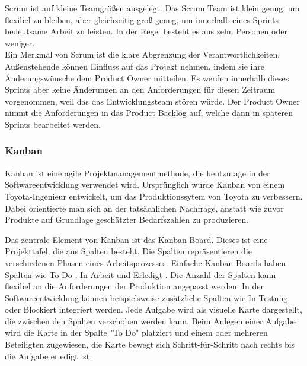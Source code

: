 \documentclass[ngerman]{seminarvorlage}
\begin{document}
Scrum ist auf kleine Teamgrößen ausgelegt. Das Scrum Team ist klein genug, um flexibel zu bleiben, aber gleichzeitig groß genug, um innerhalb eines Sprints bedeutsame Arbeit zu leisten. In der Regel besteht es aus zehn Personen oder weniger.\cite{Mucke.2024}\\
Ein Merkmal von Scrum ist die klare Abgrenzung der Verantwortlichkeiten. Außenstehende können Einfluss auf das Projekt nehmen, indem sie ihre Änderungswünsche dem Product Owner mitteilen. Es werden innerhalb dieses Sprints aber keine Änderungen an den Anforderungen für diesen Zeitraum vorgenommen, weil das das Entwicklungsteam stören würde. Der Product Owner nimmt die Anforderungen in das Product Backlog auf, welche dann in späteren Sprints bearbeitet werden.\cite{Gluck.2022}
\newpage
\subsubsection{Kanban}
Kanban ist eine agile Projektmanagementmethode, die heutzutage in der Softwareentwicklung verwendet wird. Ursprünglich wurde Kanban von einem Toyota-Ingenieur entwickelt, um das Produktionssytem von Toyota zu verbessern. Dabei orientierte man sich an der tatsächlichen Nachfrage, anstatt wie zuvor Produkte auf Grundlage geschätzter Bedarfszahlen zu produzieren.\cite{Simschek.2022}

Das zentrale Element von Kanban ist das Kanban Board. Dieses ist eine Projekttafel, die aus Spalten besteht. Die Spalten repräsentieren die verschiedenen Phasen eines Arbeitsprozesses. Einfache Kanban Boards haben Spalten wie \glqq To-Do \grqq\: , \glqq In Arbeit \grqq\: und \glqq Erledigt \grqq\: . Die Anzahl der Spalten kann flexibel an die Anforderungen der Produktion angepasst werden.  In der Softwareentwicklung können beispielsweise zusätzliche Spalten wie \glqq In Testung \grqq\: oder \glqq Blockiert\grqq\: integriert werden. Jede Aufgabe wird als visuelle Karte dargestellt, die zwischen den Spalten verschoben werden kann. Beim Anlegen einer Aufgabe wird die Karte in der Spalte "To Do" platziert und einem oder mehreren Beteiligten zugewiesen, die Karte bewegt sich Schritt-für-Schritt nach rechts bis die Aufgabe erledigt ist.\cite{Asana.2024}
\end{document}
